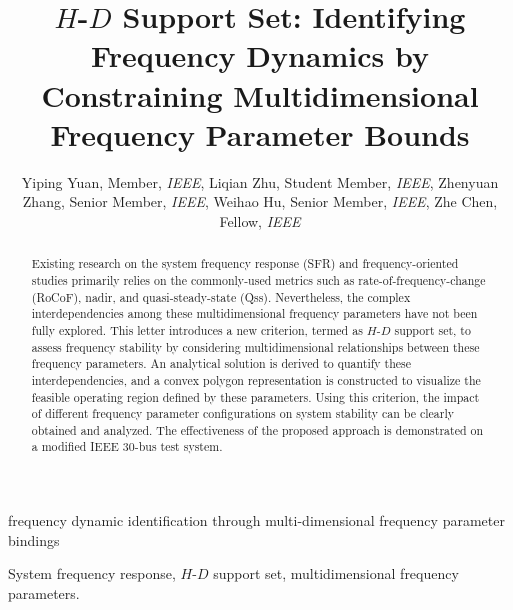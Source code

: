 \documentclass[lettersize,journal]{IEEEtran}
\begin{document}


\title{\vspace{-0.5cm} 
$H$-$D$ Support Set:  Identifying Frequency Dynamics by Constraining Multidimensional Frequency Parameter Bounds
}
\author{Yiping Yuan, Member, \textit{IEEE}, Liqian Zhu, Student Member, \textit{IEEE}, Zhenyuan Zhang, Senior Member, \textit{IEEE}, Weihao Hu, Senior Member, \textit{IEEE}, Zhe Chen, Fellow, \textit{IEEE}
}
\IEEEaftertitletext{\vspace{-2.5\baselineskip}}

%
{frequency dynamic identification through multi-dimensional frequency parameter bindings}

\maketitle


\begin{abstract}

  Existing research on the system frequency response (SFR) and frequency-oriented studies primarily relies on the commonly-used metrics such as  rate-of-frequency-change (RoCoF), nadir, and quasi-steady-state (Qss). Nevertheless, the complex interdependencies among these multidimensional frequency parameters have not been fully explored. This letter introduces a new criterion, termed as $H$-$D$ support set, to assess frequency stability by considering multidimensional relationships between these frequency parameters. An analytical solution is derived to quantify these interdependencies, and a convex polygon representation is constructed to visualize the feasible operating region defined by these parameters. Using this criterion, the impact of different frequency parameter configurations on system stability can be clearly obtained and analyzed. The effectiveness of the proposed approach is demonstrated on a modified IEEE 30-bus test system.

\end{abstract}

\begin{IEEEkeywords}
System frequency response, $H$-$D$ support set, multidimensional frequency parameters.
\end{IEEEkeywords}
\end{document}

